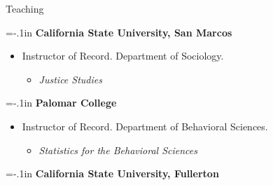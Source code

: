 \documentclass{resume} %
\newenvironment{hangt}[1]
 {\par\vspace{-\parsep}%
  \begin{itemize}[label={#1\ \quad},leftmargin=*,labelsep=0pt]
  \raggedright
  \item\relax
  \vspace*{8pt}
  }
 {\end{itemize}}
\newcommand{\datefill}{\quad \hspace{12pt}}
\begin{document}

\begin{rSection}{Teaching}
\noindent \vspace*{-1.5em}



{\parindent=-.1in {\bf California State University, San Marcos}}
\vspace*{-.5em} 

\begin{hangt}{2018  \datefill}
Instructor of Record. Department of Sociology. 
\vspace*{-.5em} 
\begin{itemize}[leftmargin=.25in] \vspace*{-.25em} 
\item {\footnotesize \it Justice Studies}
\end{itemize}
\end{hangt}

{\parindent=-.1in {\bf Palomar College}}
\vspace*{-.5em} 

\begin{hangt}{2018--2019}
Instructor of Record. Department of Behavioral Sciences. 
\vspace*{-.5em} 
\begin{itemize}[leftmargin=.25in] \vspace*{-.25em} 
\item {\footnotesize \it Statistics for the Behavioral Sciences}
\end{itemize}
\end{hangt}


{\parindent=-.1in {\bf California State University, Fullerton}}
\vspace*{-.5em} 


\end{rSection}
\end{document}
